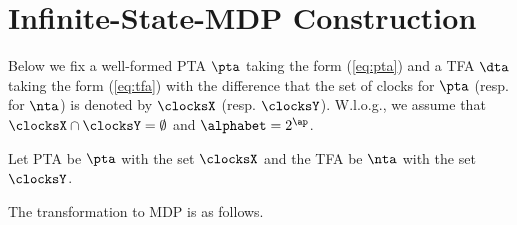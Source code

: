 \newcommand{\idx}[1]{\mbox{\sl index}
    \left (
        {#1}
    \right )
}

\newcommand{\successor}{
    \mbox{\sl succ} 
}
\vspace{-0.8em}
\section{Infinite-State-MDP Construction}
\vspace{-0.8em}


% 
% 
Below we fix a well-formed PTA $\pta$ taking the form (\ref{eq:pta}) and a TFA $\dta$ taking the form (\ref{eq:tfa}) with the difference that the set of clocks for $\pta$ (resp. for $\nta$) is denoted by $\clocksX$ (resp. $\clocksY$).
W.l.o.g., we assume that $\clocksX \cap \clocksY = \emptyset$ and $\alphabet=2^{\ap}$.

Let PTA be $\pta$ with the set $\clocksX$ and the TFA be $\nta$ with the set $\clocksY$.

The transformation to MDP is as follows.

